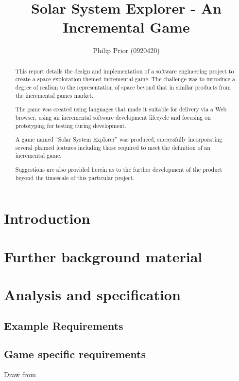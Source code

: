 \documentclass[twoside]{bhamthesis}
\title{Solar System Explorer - An Incremental Game}
\author{Philip Prior (0920420)}
\begin{document}
\maketitle

\tableofcontents

\begin{abstract}

This report details the design and implementation of a software engineering project to create a space exploration themed incremental game. The challenge was to introduce a degree of realism to the representation of space beyond that in similar products from the incremental games market.

The game was created using languages that made it suitable for delivery via a Web browser, using an incremental software development lifecycle and focusing on prototyping for testing during development.

A game named “Solar System Explorer” was produced, successfully incorporating several planned features including those required to meet the definition of an incremental game.

Suggestions are also provided herein as to the further development of the product beyond the timescale of this particular project.

\end{abstract}

\begin{acknowledgments}

\end{acknowledgments}


\section{Introduction}

\section{Further background material}


\section{Analysis and specification}
\subsection{Example Requirements}
\subsection{Game specific requirements}
Draw from 
\end{document}
